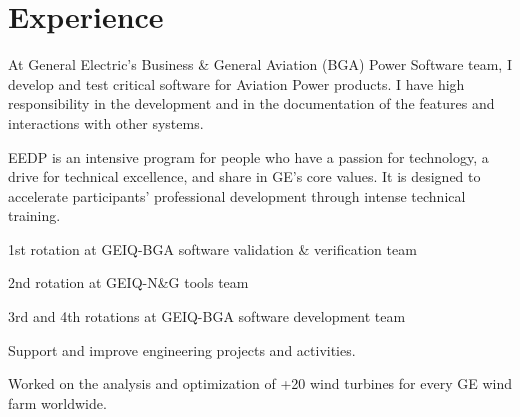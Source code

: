 \documentclass[]{deedy-resume-openfont}
\begin{document}
\begin{minipage}[t]{0.65\textwidth} 


\section{Experience}
\vspace{\topsep} %
\begin{tightemize}
\item At General Electric's Business \& General Aviation (BGA) Power Software team, I develop and test critical software for Aviation Power products. I have high responsibility in the development and in the documentation of the features and interactions with other systems.
\end{tightemize}
\sectionsep

\begin{tightemize}
\item EEDP is an intensive program for people who have a passion for technology, a drive for technical excellence, and share in GE's core values. It is designed to accelerate participants' professional development through intense technical training.
\item 1st rotation at GEIQ-BGA software validation \& verification team
\item 2nd rotation at GEIQ-N\&G tools team
\item 3rd and 4th rotations at GEIQ-BGA software development team
\end{tightemize}
\sectionsep

\begin{tightemize}
\item Support and improve engineering projects and activities.
\item Worked on the analysis and optimization of +20 wind turbines for every GE wind farm worldwide.
\end{tightemize}
\sectionsep



\end{minipage}
\end{document}
